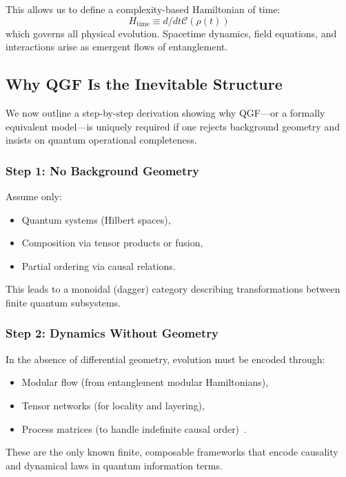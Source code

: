 \documentclass[11pt]{article}
\def\frac#1#2{#1/#2}
\begin{document}
This allows us to define a complexity-based Hamiltonian of time:
\begin{equation}
H_{\text{time}} \equiv \frac{d}{dt} \mathcal{C}(\rho(t))
\end{equation}
which governs all physical evolution. Spacetime dynamics, field equations, and interactions arise as emergent flows of entanglement.

\subsection{Why QGF Is the Inevitable Structure}

We now outline a step-by-step derivation showing why QGF—or a formally equivalent model—is uniquely required if one rejects background geometry and insists on quantum operational completeness.

\subsubsection*{Step 1: No Background Geometry}

Assume only:
\begin{itemize}
    \item Quantum systems (Hilbert spaces),
    \item Composition via tensor products or fusion,
    \item Partial ordering via causal relations.
\end{itemize}

This leads to a monoidal (dagger) category describing transformations between finite quantum subsystems.

\subsubsection*{Step 2: Dynamics Without Geometry}

In the absence of differential geometry, evolution must be encoded through:
\begin{itemize}
    \item Modular flow (from entanglement modular Hamiltonians),
    \item Tensor networks (for locality and layering),
    \item Process matrices (to handle indefinite causal order)~\cite{oreshkov2012quantum,chiribella2013quantum,costa2016quantum}.
\end{itemize}

These are the only known finite, composable frameworks that encode causality and dynamical laws in quantum information terms.
\end{document}
